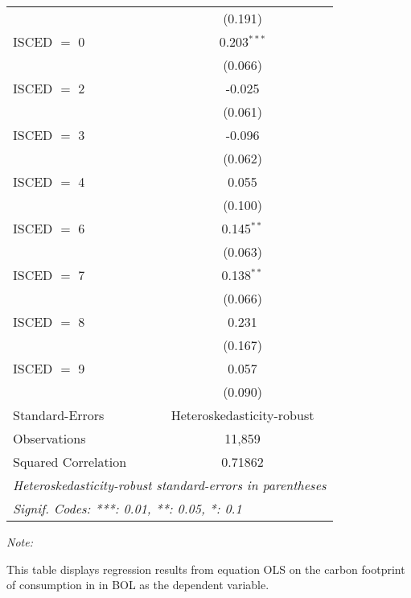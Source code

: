 \begin{table}[htbp!]
\begin{adjustbox}{width = 1\textwidth, max height = 0.95\textheight, center}
\begin{threeparttable}[b]
\begin{tabular}{lc}
                                & (0.191)\\   
            ISCED $=$ 0         & 0.203$^{***}$\\   
                                & (0.066)\\   
            ISCED $=$ 2         & -0.025\\   
                                & (0.061)\\   
            ISCED $=$ 3         & -0.096\\   
                                & (0.062)\\   
            ISCED $=$ 4         & 0.055\\   
                                & (0.100)\\   
            ISCED $=$ 6         & 0.145$^{**}$\\   
                                & (0.063)\\   
            ISCED $=$ 7         & 0.138$^{**}$\\   
                                & (0.066)\\   
            ISCED $=$ 8         & 0.231\\   
                                & (0.167)\\   
            ISCED $=$ 9         & 0.057\\   
                                & (0.090)\\   
            \midrule 
            Standard-Errors     & Heteroskedasticity-robust \\   
            Observations        & 11,859\\  
            Squared Correlation & 0.71862\\  
            \midrule \midrule
            \multicolumn{2}{l}{\emph{Heteroskedasticity-robust standard-errors in parentheses}}\\
            \multicolumn{2}{l}{\emph{Signif. Codes: ***: 0.01, **: 0.05, *: 0.1}}\\
         \end{tabular}
         
         \begin{tablenotes}\item \medskip \textit{Note:}
            \item This table displays regression results from equation OLS on the carbon footprint of consumption in  in BOL as the dependent variable.  
         \end{tablenotes}
      \end{threeparttable}
   \end{adjustbox}
\end{table}


